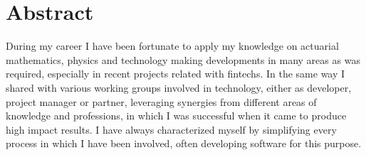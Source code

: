 \section{Abstract}

During my career I have been fortunate to apply my knowledge on actuarial mathematics,
physics and technology making developments in many areas as was required, especially in
recent projects related with fintechs. In the same way I shared with various working groups
involved in technology, either as developer, project manager or partner, leveraging synergies
from different areas of knowledge and professions, in which I was successful when it came
to produce high impact results. I have always characterized myself by simplifying every
process in which I have been involved, often developing software for this purpose.
